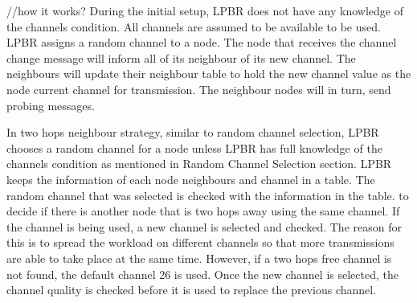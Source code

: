 	


//how it works?
During the initial setup, LPBR does not have any knowledge of the channels condition. All channels are assumed to be available to be used. LPBR assigns a random channel to a node. The node that receives the channel change message will inform all of its neighbour of its new channel. The neighbours will update their neighbour table to hold the new channel value as the node current channel for transmission. The neighbour nodes will in turn, send probing messages.

In two hops neighbour strategy, similar to random channel selection, LPBR chooses a random channel for a node unless LPBR has full knowledge of the channels condition as mentioned in Random Channel Selection section. LPBR keeps the information of each node neighbours and channel in a table. The random channel that was selected is checked with the information in the table. to decide if there is another node that is two hops away using the same channel. If the channel is being used, a new channel is selected and checked. The reason for this is to spread the workload on different channels so that more transmissions are able to take place at the same time. However, if a two hops free channel is not found, the default channel 26 is used. Once the new channel is selected, the channel quality is checked before it is used to replace the previous channel.


